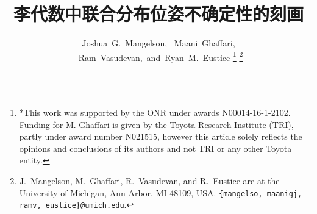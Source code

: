 \documentclass[journal]{style/IEEEtran}
\theoremstyle{nospace}
\begin{document}
\title{李代数中联合分布位姿不确定性的刻画}

\author{Joshua~G.~Mangelson, ~Maani~Ghaffari, ~Ram~Vasudevan,~and~Ryan~M.~Eustice%
  \thanks{*This work was supported by the \acl{ONR} under awards
    N00014-16-1-2102. Funding for M. Ghaffari is given by the Toyota Research Institute (TRI), partly under award number N021515, however this article solely reflects the opinions and conclusions of its authors and not TRI or any other Toyota entity.}%
  \thanks{J.~Mangelson, M.~Ghaffari, R.~Vasudevan, and R.~Eustice are at the University of Michigan, Ann Arbor, MI 48109, USA. \texttt{\{mangelso, maanigj, ramv, eustice\}@umich.edu}.}  %
}


\maketitle


\acresetall

\IEEEpeerreviewmaketitle



%

%



\balance

{\footnotesize
}
\end{document}
